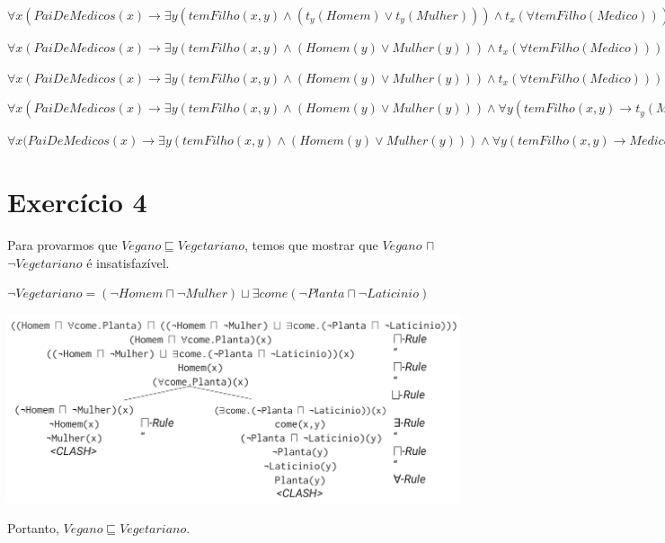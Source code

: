 \documentclass[12pt,letterpaper]{article}
\begin{document}
\begin{normalsize}
		$\forall x(PaiDeMedicos(x) \to \exists y(temFilho(x,y) \land (t_y(Homem) \lor t_y(Mulher))) \land t_x(\forall temFilho(Medico)))$
		
		$\forall x(PaiDeMedicos(x) \to \exists y(temFilho(x,y) \land (Homem(y) \lor Mulher(y))) \land t_x(\forall temFilho(Medico)))$
		
		$\forall x(PaiDeMedicos(x) \to \exists y(temFilho(x,y) \land (Homem(y) \lor Mulher(y))) \land t_x(\forall temFilho(Medico)))$
		
		$\forall x(PaiDeMedicos(x) \to \exists y(temFilho(x,y) \land (Homem(y) \lor Mulher(y))) \land \forall y(temFilho(x,y) \to t_y(Medico)))$
		
		$\forall x(PaiDeMedicos(x) \to \exists y(temFilho(x,y) \land (Homem(y) \lor Mulher(y))) \land \forall y(temFilho(x,y) \to Medico (y))$
		
		\section*{Exercício 4}
		
		Para provarmos que $Vegano \sqsubseteq Vegetariano$, temos que mostrar que $Vegano$ $\sqcap$ $\lnot Vegetariano$ é insatisfazível.
		
		$\lnot Vegetariano = (\lnot Homem \sqcap \lnot Mulher) \sqcup \exists come(\lnot Planta \sqcap \lnot Laticinio)$
		
		\includegraphics[width=17cm]{ex4.png}
		
		Portanto, $Vegano \sqsubseteq Vegetariano$.
	\end{normalsize}
			 
\end{document}
